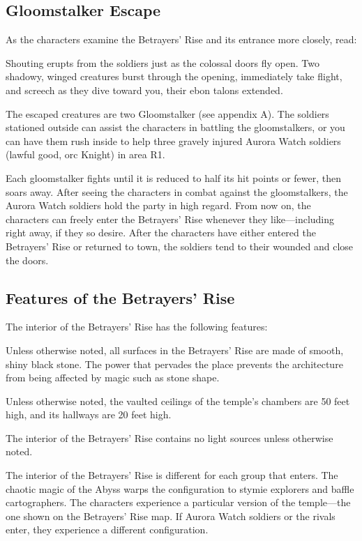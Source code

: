\documentclass[10pt,a4paper,twoside,bg=print,twocolumn,openany,nodeprecatedcode]{dndbook}
\begin{document}
\subsection{Gloomstalker Escape}
As the characters examine the Betrayers' Rise and its entrance more closely, read:

\begin{DndReadAloud}{}
Shouting erupts from the soldiers just as the colossal doors fly open. Two shadowy, winged creatures burst through the opening, immediately take flight, and screech as they dive toward you, their ebon talons extended.

\end{DndReadAloud}

The escaped creatures are two Gloomstalker (see appendix A). The soldiers stationed outside can assist the characters in battling the gloomstalkers, or you can have them rush inside to help three gravely injured Aurora Watch soldiers (lawful good, orc Knight) in area R1.

Each gloomstalker fights until it is reduced to half its hit points or fewer, then soars away. After seeing the characters in combat against the gloomstalkers, the Aurora Watch soldiers hold the party in high regard. From now on, the characters can freely enter the Betrayers' Rise whenever they like—including right away, if they so desire. After the characters have either entered the Betrayers' Rise or returned to town, the soldiers tend to their wounded and close the doors.

\subsection{Features of the Betrayers' Rise}
The interior of the Betrayers' Rise has the following features:


\begin{description}[nolistsep]
\item[Black Stone.]
Unless otherwise noted, all surfaces in the Betrayers' Rise are made of smooth, shiny black stone. The power that pervades the place prevents the architecture from being affected by magic such as stone shape.
\item[Ceilings.]
Unless otherwise noted, the vaulted ceilings of the temple's chambers are 50 feet high, and its hallways are 20 feet high.
\item[Light.]
The interior of the Betrayers' Rise contains no light sources unless otherwise noted.
\item[Shifting Halls.]
The interior of the Betrayers' Rise is different for each group that enters. The chaotic magic of the Abyss warps the configuration to stymie explorers and baffle cartographers. The characters experience a particular version of the temple—the one shown on the Betrayers' Rise map. If Aurora Watch soldiers or the rivals enter, they experience a different configuration.
\end{description}
\end{document}
